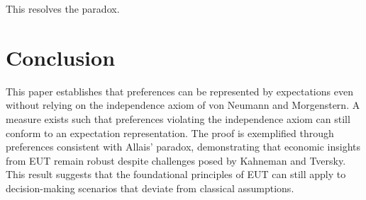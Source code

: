 \documentclass{article}
\begin{document}
This resolves the paradox.

\section{Conclusion}

This paper establishes that preferences can be represented by expectations even without relying on the independence axiom of von Neumann and Morgenstern. A measure exists such that preferences violating the independence axiom can still conform to an expectation representation. The proof is exemplified through preferences consistent with Allais' paradox, demonstrating that economic insights from EUT remain robust despite challenges posed by Kahneman and Tversky. This result suggests that the foundational principles of EUT can still apply to decision-making scenarios that deviate from classical assumptions.
\end{document}
